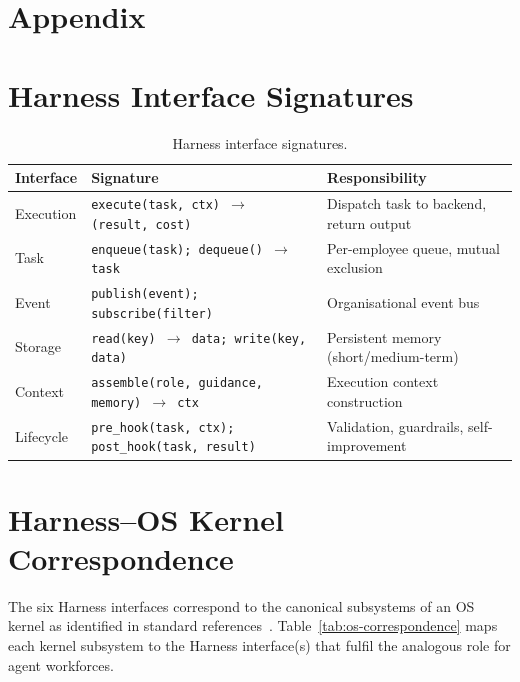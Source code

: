 \appendix
\section*{Appendix}



\section{Harness Interface Signatures}
\label{sec:harness-signatures}

\begin{table}[H]
\centering
\caption{Harness interface signatures.}
\label{tab:harness-interfaces}
\small
\setlength{\tabcolsep}{4pt}
\begin{tabularx}{\textwidth}{@{}>{\ttfamily\raggedright\arraybackslash}p{}>{\raggedright\arraybackslash}p{}X@{}}
\toprule
\textbf{Interface} & \textbf{Signature} & \textbf{Responsibility} \\
\midrule
Execution & \texttt{execute(task, ctx) $\to$ (result, cost)} & Dispatch task to backend, return output \\
\addlinespace
Task & \texttt{enqueue(task); dequeue() $\to$ task} & Per-employee queue, mutual exclusion \\
\addlinespace
Event & \texttt{publish(event); subscribe(filter)} & Organisational event bus \\
\addlinespace
Storage & \texttt{read(key) $\to$ data; write(key, data)} & Persistent memory (short/medium-term) \\
\addlinespace
Context & \texttt{assemble(role, guidance, memory) $\to$ ctx} & Execution context construction \\
\addlinespace
Lifecycle & \texttt{pre\_hook(task, ctx); post\_hook(task, result)} & Validation, guardrails, self-improvement \\
\bottomrule
\end{tabularx}
\end{table}

\section{Harness--OS Kernel Correspondence}
\label{sec:os-mapping}

The six Harness interfaces correspond to the canonical subsystems of an OS kernel as identified in standard references~\cite{tanenbaum2014modern, silberschatz2018os}.  Table~\ref{tab:os-correspondence} maps each kernel subsystem to the Harness interface(s) that fulfil the analogous role for agent workforces.

